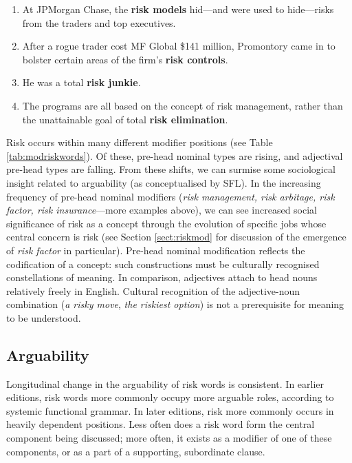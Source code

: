             \begin{enumerate}  [before=\itshape,font=\normalfont] \setlength\itemsep{0em} \small
                \item At JPMorgan Chase, the \textbf{risk models} hid---and were used to hide---risks from the traders and top executives.
                \item After a rogue trader cost MF Global \$141 million, Promontory came in to bolster certain areas of the firm's \textbf{risk controls}.
                \item He was a total \textbf{risk junkie}.
                \item The programs are all based on the concept of risk management, rather than the unattainable goal of total \textbf{risk elimination}.
            \end{enumerate}

            Risk occurs within many different modifier positions (see Table \ref{tab:modriskwords}). Of these, pre-head nominal types are rising, and adjectival pre-head types are falling. From these shifts, we can surmise some sociological insight related to arguability (as conceptualised by SFL). In the increasing frequency of pre-head nominal modifiers (\emph{risk management, risk arbitage, risk factor, risk insurance}---more examples above), we can see increased social significance of risk as a concept through the evolution of specific jobs whose central concern is risk (see Section \ref{sect:riskmod} for discussion of the emergence of \emph{risk factor} in particular). Pre-head nominal modification reflects the codification of a concept: such constructions must be culturally recognised constellations of meaning. In comparison, adjectives attach to head nouns relatively freely in English. Cultural recognition of the adjective-noun combination (\emph{a risky move}, \emph{the riskiest option}) is not a prerequisite for meaning to be understood.

            \subsection{Arguability} \label{sect:arg}

            Longitudinal change in the arguability of risk words is consistent. In earlier editions, risk words more commonly occupy more arguable roles, according to systemic functional grammar. In later editions, risk more commonly occurs in heavily dependent positions. Less often does a risk word form the central component being discussed; more often, it exists as a modifier of one of these components, or as a part of a supporting, subordinate clause.

